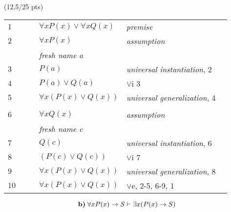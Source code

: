\documentclass[a4paper,12pt]{article}
\begin{document}
\hfill \small{(12.5/25 pts)}\\
\begin{tcolorbox}

\begin{table}[H]
    \centering
	\begin{tabular}{*6{l}}
	
	$1$ & & & $\forall xP(x) \vee \forall xQ(x)$ & \textit{premise} & \\ \cline{1-6}
	
	$2$ & & & $\forall xP(x)$ &\textit{assumption} & \\ \cline{2-5}
	
	    & & & \textit{fresh name a} & & \\
	
	$3$ & & & $P(a)$ & \textit{universal instantiation}, 2 & \\ 
	
	$4$ & & & $P(a) \vee Q(a)$ & $\vee$i 3 & \\  \cline{2-5}
	
	$5$ & & & $\forall x (P(x) \vee Q(x))$ & \textit{universal generalization}, 4 & \\  \cline{1-6}
	
	    & & & & & \\ \cline{2-6} \cline{2-6}
	
	$6$ & & & $\forall xQ(x)$ & \textit{assumption} & \\ \cline{3-5} \cline{3-5}
	 
	    & & & \textit{fresh name c} & & \\
	
	$7$ & & & $Q(c)$ & \textit{universal instantiation}, 6 & \\ 
	
	$8$ & & & $ (P(c) \vee Q(c))$ & $\vee$i 7 & \\ \cline{3-5} \cline{3-5}
	
	$9$ & & & $\forall x (P(x) \vee Q(x))$ & \textit{universal generalization}, 8 & \\ \cline{2-6} \cline{2-6}
	
	$10$ & & & $\forall x (P(x) \vee Q(x))$ & $\vee$e, 2-5, 6-9, 1 & \\ 
	
\end{tabular}
\end{table}

\end{tcolorbox}

\begin{equation*}
    \textbf{b)} \; \forall x P(x) \rightarrow S \vdash \exists x (P(x)\rightarrow S)\\
\end{equation*}
\end{document}
